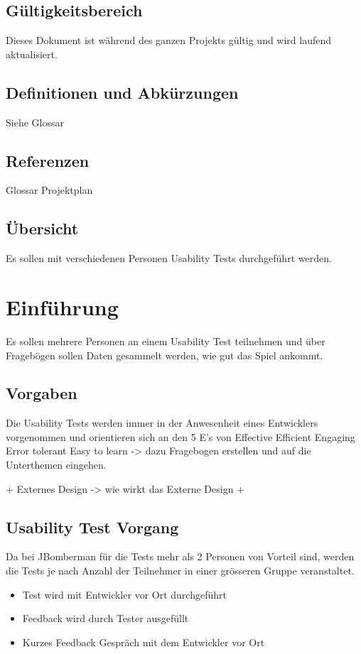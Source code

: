 \documentclass[11pt]{scrartcl}
\begin{document}
\subsection{Gültigkeitsbereich}
Dieses Dokument ist während des ganzen Projekts gültig und wird laufend aktualisiert.
\subsection{Definitionen und Abkürzungen}
Siehe Glossar
\subsection{Referenzen}
Glossar
Projektplan
\subsection{Übersicht}
Es sollen mit verschiedenen Personen Usability Tests durchgeführt werden.

\section{Einführung}
Es sollen mehrere Personen an einem Usability Test teilnehmen und über 
Fragebögen sollen Daten gesammelt werden, wie gut das Spiel ankommt.

\subsection{Vorgaben}
Die Usability Tests werden immer in der Anwesenheit eines Entwicklers 
vorgenommen und orientieren sich an den 5 E's von
Effective
Efficient
Engaging
Error tolerant
Easy to learn -> dazu Fragebogen erstellen und auf die Unterthemen eingehen.

+ Externes Design -> wie wirkt das Externe Design
+ 

\subsection{Usability Test Vorgang}
Da bei JBomberman für die Tests mehr als 2 Personen von Vorteil sind, werden die 
Tests je nach Anzahl der Teilnehmer in einer grösseren Gruppe veranstaltet.
\begin{itemize}
  \item Test wird mit Entwickler vor Ort durchgeführt
  \item Feedback wird durch Tester ausgefüllt
  \item Kurzes Feedback Gespräch mit dem Entwickler vor Ort
\end{itemize}
\end{document}
